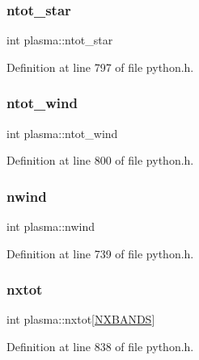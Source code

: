 \subsubsection{\texorpdfstring{ntot\+\_\+star}{ntot\_star}}
{\footnotesize\ttfamily int plasma\+::ntot\+\_\+star}



Definition at line 797 of file python.\+h.

\mbox{\label{structplasma_a94bce860bda9cee5964584ca552b256a}} 
\subsubsection{\texorpdfstring{ntot\+\_\+wind}{ntot\_wind}}
{\footnotesize\ttfamily int plasma\+::ntot\+\_\+wind}



Definition at line 800 of file python.\+h.

\mbox{\label{structplasma_a56c7e960c18e2fc47a147877bc9e5fe8}} 
\subsubsection{\texorpdfstring{nwind}{nwind}}
{\footnotesize\ttfamily int plasma\+::nwind}



Definition at line 739 of file python.\+h.

\mbox{\label{structplasma_a8f5a30977d126bd3ec95bb175056e9c2}} 
\subsubsection{\texorpdfstring{nxtot}{nxtot}}
{\footnotesize\ttfamily int plasma\+::nxtot\mbox{[}\hyperlink{python_8h_ac640b7fc429348ef2f6781704d3c5163}{N\+X\+B\+A\+N\+DS}\mbox{]}}



Definition at line 838 of file python.\+h.

\mbox{\label{structplasma_a76771b8118b11b955ccf91b6208b42f4}} 

